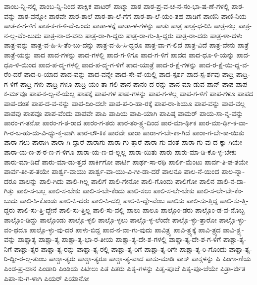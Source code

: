 {ಪಾಂಬ-ನ್ನಿ-ನಲ್ಲಿ
ಪಾಂಬ-ನ್ನಿ-ನಿಂದ
ಪಾಕ್ಷಿಕ
ಪಾಟರ್
ಪಾಟ್ನಾ
ಪಾಠ
ಪಾಠ-ಪ್ರ-ವ-ಚ-ನ-ಸಂ-ಭಾ-ಷ-ಣೆ-ಗಳಲ್ಲಿ
ಪಾಠ-ವನ್ನು
ಪಾಠ-ವನ್ನೋ
ಪಾಠವೇ
ಪಾಠ-ಶಾಲೆ
ಪಾಠ-ಶಾ-ಲೆ-ಗೆಗೆ
ಪಾಠ-ಶಾ-ಲೆ-ಯಂ-ತಹ
ಪಾಡಿಗೆ
ಪಾಣಿನಿ
ಪಾಣಿ-ನಿಯ
ಪಾತ-ಕ-ಗ-ಳಿಗೆ
ಪಾತ-ಕ-ಗ-ಳಿ-ವೆ-ಒಂದು
ಪಾತಾ-ಳಕ್ಕೆ
ಪಾತಾ-ಳ-ಗಳನ್ನು
ಪಾತು
ಪಾತ್ರ
ಪಾತ್ರ-ಧ-ರಿಸಿ
ಪಾತ್ರ-ನಲ್ಲ
ಪಾತ್ರ-ನ-ಲ್ಲ-ವೆಂ-ಬುದು
ಪಾತ್ರ-ನಾ-ದ-ವನು
ಪಾತ್ರ-ರಾ-ಗಿ-ದ್ದರು
ಪಾತ್ರ-ರಾ-ಗು-ತ್ತಿ-ದ್ದರು
ಪಾತ್ರ-ರಾ-ದರು
ಪಾತ್ರ-ಳಾ-ದಳು
ಪಾತ್ರ-ವನ್ನು
ಪಾತ್ರ-ವ-ಹಿ-ಸಿ-ತೆಂ-ಬು-ದನ್ನು
ಪಾತ್ರ-ವ-ಹಿ-ಸಿ-ದ್ದರೂ
ಪಾತ್ರ-ವಾ-ಗ-ಲಿದೆ
ಪಾತ್ರ-ವಿದೆ
ಪಾತ್ರ-ವೇನು
ಪಾತ್ರೆ
ಪಾತ್ರೆ-ಯನ್ನು
ಪಾದ
ಪಾದ-ಗಳನ್ನು
ಪಾದ-ಗಳಲ್ಲಿ
ಪಾದ-ಗ-ಳಿಗೂ
ಪಾದ-ಗ-ಳಿಗೆ
ಪಾದದ
ಪಾದ-ಧೂ-ಳಿ-ಯನ್ನು
ಪಾದ-ಧೂ-ಳಿ-ಯಿಂದ
ಪಾದ-ಪ-ದ್ಮ-ಗಳಲ್ಲಿ
ಪಾದ-ಪ-ದ್ಮ-ಗ-ಳಿಗೆ
ಪಾದ-ಯಾತ್ರೆ
ಪಾದ-ರ-ಕ್ಷೆ-ಗಳನ್ನು
ಪಾದ-ರ-ಕ್ಷೆ-ಯಿ-ದ್ದ-ವ-ರೆಂ-ದರೆ
ಪಾದ-ರಿ-ಯಾದ
ಪಾದ-ವನ್ನು
ಪಾದ-ವನ್ನೇ
ಪಾದ-ಸೇ-ವೆ-ಯಲ್ಲಿ
ಪಾದ-ಸ್ಪರ್ಶ
ಪಾದ-ಸ್ಪ-ರ್ಶವು
ಪಾದ್ರಿ
ಪಾದ್ರಿ-ಗ-ಳಿಗೆ
ಪಾದ್ರಿ-ಗಳು
ಪಾದ್ರಿ-ಗಳೂ
ಪಾದ್ರಿ-ಯಂ-ತಾ-ಗಲಿ
ಪಾನ
ಪಾನಂ-ದ-ರನ್ನು
ಪಾನ-ಮಾ-ಡುವ
ಪಾನ್
ಪಾಪ
ಪಾಪ-ಕ-ರ್ಮವೂ
ಪಾಪ-ಕ-ಲ್ಪ-ನೆ-ಯೆಲ್ಲ
ಪಾಪಕ್ಕೆ
ಪಾಪ-ಗಳ
ಪಾಪ-ಗಳನ್ನು
ಪಾಪ-ಗ-ಳಲ್ಲ
ಪಾಪ-ಗ-ಳಿಗೆ
ಪಾಪ-ಗಳೂ
ಪಾಪದ
ಪಾಪ-ದಂತೆ
ಪಾಪ-ದ-ವ-ನನ್ನು
ಪಾಪ-ದಿಂ-ದಲೇ
ಪಾಪ-ಪ-ರಿ-ಹಾ-ರಕ್ಕೆ
ಪಾಪ-ರಾ-ಶಿಯೂ
ಪಾಪ-ವನ್ನು
ಪಾಪ-ವಲ್ಲ
ಪಾಪವು
ಪಾಪವೂ
ಪಾಪ-ವೆಂದು
ಪಾಪವೇ
ಪಾಪಿ
ಪಾಪಿಯ
ಪಾಪಿ-ಯಾಗಿ
ಪಾಪಿಷ್ಠ
ಪಾಮರ್
ಪಾಯ-ಸಾ-ನ್ನ-ವನ್ನು
ಪಾರಂ-ಗ-ತನೋ
ಪಾರಂ-ಗ-ತ-ರಾದ
ಪಾರಂ-ಗ-ತರು
ಪಾರ-ತಂ-ತ್ರ್ಯ-ದಿಂದ
ಪಾರ-ಮಾ-ರ್ಥಿಕ
ಪಾರ-ಮಾ-ರ್ಥಿ-ಕ-ವಾ-ಗಿ-ರ-ಬ-ಹು-ದು-ವಿ-ಧ್ಯು-ಕ್ತ-ವಾಗಿ
ಪಾರ-ಲೌ-ಕಿಕ
ಪಾರವೇ
ಪಾರಾ
ಪಾರಾ-ಗ-ಬೇ-ಕಾ-ಗಿದೆ
ಪಾರಾ-ಗ-ಬೇ-ಕಾ-ಯಿತು
ಪಾರಾ-ಗಲು
ಪಾರಾಗಿ
ಪಾರಾ-ಗಿ-ದ್ದಾರೆ
ಪಾರಾಗು
ಪಾರಾ-ಗು-ತ್ತಾರೆ
ಪಾರಾ-ಗು-ವಂತೆ
ಪಾರಾ-ಗು-ವು-ದ-ಕ್ಕಾ-ಗಿಯೇ
ಪಾರಾ-ಯ-ಣ-ಪ-ಠ-ಣ-ಗ-ಳಿಗೂ
ಪಾರಾ-ಯ-ಣ-ದ-ಲ್ಲಲ್ಲ
ಪಾರಾ-ಯಿತು
ಪಾರು
ಪಾರು-ಮಾ-ಡಿ-ಕೊ-ಳ್ಳ-ಬೇಕು
ಪಾರು-ಮಾ-ಡಿದೆ
ಪಾರು-ಮಾ-ಡು-ತ್ತದೆ
ಪಾರ್ಕಿಗೋ
ಪಾರ್ಟಿ
ಪಾರ್ಥ-ಸಾ-ರಥಿ
ಪಾರ್ಲಿ-ಮೆಂಟು
ಪಾರ್ವ-ತಿ-ಪ-ತಯೇ
ಪಾರ್ವ-ತೀ-ಪ-ತಯೇ
ಪಾರ್ಶ್ವ-ವಾಯು
ಪಾರ್ಶ್ವ-ವಾ-ಯು-ವಿ-ಗೀ-ಡಾ-ದರೆ
ಪಾಲನೂ
ಪಾಲ-ನೆ-ಯಿಂದ
ಪಾಲ-ನ್ನಾ-ದರೂ
ಪಾಲನ್ನು
ಪಾಲಿ-ಗಿದು
ಪಾಲಿ-ಗಿಲ್ಲ
ಪಾಲಿಗೆ
ಪಾಲಿ-ಗೇನೋ
ಪಾಲಿ-ಗೊಂದು
ಪಾಲಿಗೋ
ಪಾಲಿನ
ಪಾಲಿ-ನ-ದಾ-ಗಿತ್ತು
ಪಾಲಿ-ಸ-ಬಲ್ಲ
ಪಾಲಿ-ಸ-ಬೇಕು
ಪಾಲಿ-ಸ-ಬೇ-ಕೆಂದು
ಪಾಲಿ-ಸಲು
ಪಾಲಿ-ಸ-ಲೇ-ಬೇಕು
ಪಾಲಿ-ಸ-ಲೇ-ಬೇ-ಕೆಂ-ಬುದು
ಪಾಲಿ-ಸಿ-ಕೊಂಡು
ಪಾಲಿ-ಸಿ-ದರು
ಪಾಲಿ-ಸಿ-ದಲ್ಲಿ
ಪಾಲಿ-ಸಿ-ದ್ದೇ-ವೆಂಬ
ಪಾಲಿಸು
ಪಾಲಿ-ಸು-ತ್ತಿದ್ದ
ಪಾಲಿ-ಸು-ತ್ತಿ-ದ್ದರು
ಪಾಲಿ-ಸು-ತ್ತಿ-ದ್ದೇನೆ
ಪಾಲಿ-ಸು-ತ್ತಿಲ್ಲ
ಪಾಲಿ-ಸು-ವಲ್ಲಿ
ಪಾಲು
ಪಾಲೂ
ಪಾಲ್ಗೊಂ-ಡರು
ಪಾಲ್ಗೊಂ-ಡ-ವ-ನೊಬ್ಬ
ಪಾಲ್ಗೊಂ-ಡಿದ್ದು
ಪಾಲ್ಗೊಂಡು
ಪಾಲ್ಗೊ-ಳ್ಳಲಿ
ಪಾಲ್ಗೊ-ಳ್ಳಲು
ಪಾಲ್ಗೊ-ಳ್ಳ-ಲೆಂದೇ
ಪಾಲ್ಗೊ-ಳ್ಳು-ತ್ತಾರೋ
ಪಾಲ್ಗೊ-ಳ್ಳು-ವಂ-ಥದೂ
ಪಾಲ್ಗೊ-ಳ್ಳು-ವು-ದರ
ಪಾಳು-ಬಿದ್ದ
ಪಾವ-ನ-ವಾ-ಗು-ವುದು
ಪಾವಿತ್ರ್ಯ
ಪಾವಿ-ತ್ರ್ಯಕ್ಕೆ
ಪಾವಿ-ತ್ರ್ಯದ
ಪಾವಿ-ತ್ರ್ಯ-ವನ್ನು
ಪಾಶ್ಚಾತ್ಯ
ಪಾಶ್ಚಾ-ತ್ಯ
ಪಾಶ್ಚಾ-ತ್ಯ-ಭಾ-ರ-ತೀಯ
ಪಾಶ್ಚಾ-ತ್ಯ-ದೇ-ಶ-ಗಳಲ್ಲಿ
ಪಾಶ್ಚಾ-ತ್ಯ-ದೇ-ಶ-ಗ-ಳಿಗೆ
ಪಾಶ್ಚಾ-ತ್ಯ-ನಿಗೆ
ಪಾಶ್ಚಾ-ತ್ಯರ
ಪಾಶ್ಚಾ-ತ್ಯ-ರನ್ನು
ಪಾಶ್ಚಾ-ತ್ಯ-ರಲ್ಲಿ
ಪಾಶ್ಚಾ-ತ್ಯ-ರಿಗೆ
ಪಾಶ್ಚಾ-ತ್ಯ-ರಿಗೇ
ಪಾಶ್ಚಾ-ತ್ಯ-ರಿ-ಗೊಂದು
ಪಾಶ್ಚಾ-ತ್ಯ-ರಿ-ದ್ದೀ-ರ-ಲ್ಲ-ತುಂಬ
ಪಾಶ್ಚಾ-ತ್ಯರು
ಪಾಶ್ಚಾ-ತ್ಯರೂ
ಪಾಶ್ಚಾ-ತ್ಯ-ವಾದ
ಪಾಸು-ಮಾಡಿ
ಪಾಸ್
ಪಾಸ್ಗಳನ್ನು
ಪಿ
ಪಿಂಗಾ-ಣಿಯ
ಪಿಂಡ-ಪ್ರ-ದಾನ
ಪಿಂಡಾರಿ
ಪಿಂಡಿಯ
ಪಿಟೀಲು
ಪಿತ
ಪಿತರು
ಪಿತೃ-ಗಳನ್ನು
ಪಿತೃ-ಪೂಜೆ
ಪಿತೃ-ಪೂ-ಜೆಯೇ
ಪಿತ್ರಾ-ರ್ಜಿತ
ಪಿಪಾ-ಸು-ಗ-ಳಾಗಿ
ಪಿಯರ್
ಪಿಯಾನೋ
}
